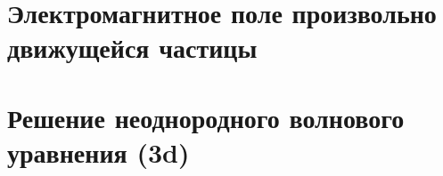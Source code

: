 \section{Электромагнитное поле произвольно движущейся частицы}

\section{Решение неоднородного волнового уравнения (3d)}
